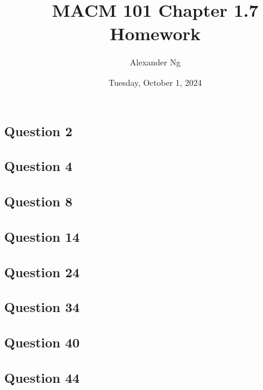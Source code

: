 \documentclass[12pt]{article}
\begin{document}
\title{MACM 101 Chapter 1.7 Homework}
\author{Alexander Ng}
\date{Tuesday, October 1, 2024}

\maketitle

\subsection*{Question 2}
\subsection*{Question 4}
\subsection*{Question 8}
\subsection*{Question 14}
\subsection*{Question 24}
\subsection*{Question 34}
\subsection*{Question 40}
\subsection*{Question 44}
\end{document}
